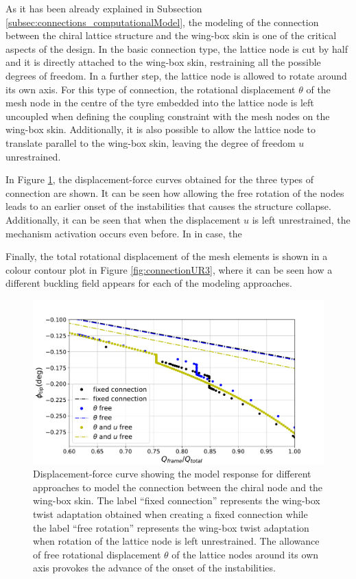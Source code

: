     As it has been already explained in Subsection \ref{subsec:connections_computationalModel}, the modeling of the connection between the chiral lattice structure and the wing-box skin is one of the critical aspects of the design. In the basic connection type, the lattice node is cut by half and it is directly attached to the wing-box skin, restraining all the possible degrees of freedom. In a further step, the lattice node is allowed to rotate around its own axis. For this type of connection,  the rotational displacement $\theta$ of the mesh node in the centre of the tyre embedded into the lattice node is left uncoupled when defining the coupling constraint with the mesh nodes on the wing-box skin. Additionally, it is also possible to allow the lattice node to translate parallel to the wing-box skin, leaving the degree of freedom $u$ unrestrained.

    In Figure \ref{fig:UR1_tau-additionalBCAll}, the displacement-force curves obtained for the three types of connection are shown. It can be seen how allowing the free rotation of the nodes leads to an earlier onset of the instabilities that causes the structure collapse. Additionally, it can be seen that when the displacement $u$ is left unrestrained, the mechanism activation occurs even before. In in case, the 

    Finally, the total rotational displacement of the mesh elements is shown in a colour contour plot in Figure \ref{fig:connectionUR3}, where it can be seen how a different buckling field appears for each of the modeling approaches. 

    \begin{figure}[!htpb]
      \centering
      \includegraphics[width=0.8 \textwidth]{figures/further/UR1_tau-additionalBCAll}
      \caption[Displacement-force curve showing the model response for different approaches to model the connection between the chiral node and the wing-box skin]{Displacement-force curve showing the model response for different approaches to model the connection between the chiral node and the wing-box skin. The label ``fixed connection'' represents the wing-box twist adaptation obtained when creating a fixed connection while the label ``free rotation'' represents the wing-box twist adaptation when rotation of the lattice node is left unrestrained. The allowance of free rotational displacement $\theta$ of the lattice nodes around its own axis provokes the advance of the onset of the instabilities.}
      \label{fig:UR1_tau-additionalBCAll}
    \end{figure}


